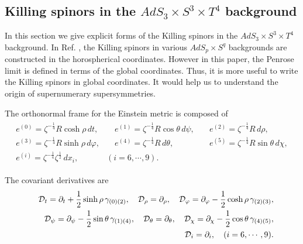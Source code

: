 \documentclass[a4paper,12pt]{article}
\begin{document}
\begin{appendix}
\section{Killing spinors in the $AdS_3\times S^3\times T^4$ background}\label{b}

In this section we give explicit forms of the Killing spinors in the $AdS_3\times S^3\times T^4$ background. In Ref. \cite{lu}, the Killing spinors in various $AdS_p\times S^q$ backgrounds are constructed in the horospherical coordinates. However in this paper, the Penrose limit is defined in terms of the global coordinates. Thus, it is more useful to write the Killing spinors in global coordinates. It would help us to understand the origin of supernumerary supersymmetries.

The orthonormal frame for the Einstein metric is composed of 
\begin{eqnarray}
\begin{array}{lll}
e^{(0)}=\zeta^{-\frac{1}{4}}R\cosh{\rho}\,dt,&\quad e^{(1)}=\zeta^{-\frac{1}{4}}R\cos{\theta}\,d\psi,&\quad e^{(2)}=\zeta^{-\frac{1}{4}}R\,d\rho,\\
e^{(3)}=\zeta^{-\frac{1}{4}}R\sinh{\rho}\,d\varphi,&\quad e^{(4)}=\zeta^{-\frac{1}{4}}R\,d\theta,&\quad e^{(5)}=\zeta^{-\frac{1}{4}}R\sin{\theta}\,d\chi,\\
e^{(i)}=\zeta^{-\frac{1}{4}}\zeta^{\frac{1}{2}}\,dx_i,&(i=6,\cdots, 9).&
\end{array}
\end{eqnarray}

The covariant derivatives are
\begin{eqnarray}
&&{\cal D}_t=\partial_t+\frac{1}{2}\sinh{\rho}\,\gamma_{(0)(2)},\quad {\cal D}_\rho=\partial_\rho,\quad {\cal D}_\varphi=\partial_\varphi-\frac{1}{2}\cosh{\rho}\,\gamma_{(2)(3)},\nonumber\\
&&{\cal D}_\psi=\partial_\psi-\frac{1}{2}\sin{\theta}\,\gamma_{(1)(4)},\quad{\cal D}_\theta=\partial_\theta,\quad {\cal D}_\chi=\partial_\chi-\frac{1}{2}\cos{\theta}\,\gamma_{(4)(5)},\nonumber\\
&&{\cal D}_i=\partial_i,\quad (i=6,\cdots, 9).
\end{eqnarray}


\end{appendix}
\end{document}
